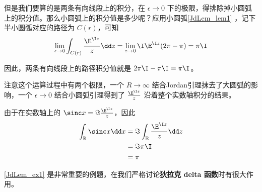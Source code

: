 \begin{example}{}
但是我们要算的是两条有向线段上的积分，在 $\epsilon\to 0$ 下的极限，得排除掉小圆弧上的积分值。那么小圆弧上的积分值是多少呢？应用小圆弧\autoref{JdLem_lem1} ，记下半小圆弧对应的路径为 $C(r)$，可知
\begin{equation}
\lim_{\epsilon\to 0}\int_{C(r)}\frac{\E^{\I z}}{z}\dd z=\lim_{z\to 0}\I\E^{\I z}(2\pi-\pi)=\pi\I
\end{equation}

因此，两条有向线段上的路径积分值就是 $2\pi\I-\pi\I=\pi\I$。

注意这个运算过程中有两个极限，一个 $R\to\infty$ 结合Jordan引理抹去了大圆弧的影响，一个 $\epsilon\to 0$ 结合小圆弧引理得到了 $\frac{\E^{\I z}}{z}$ 沿着整个实数轴积分的结果。

由于在实数轴上的 $\sinc x=\Im \frac{\E^{\I z}}{z}$，因此
\begin{equation}
\begin{aligned}
\int_{\mathbb{R}}\sinc x \dd x&=\Im \int_{\mathbb{R}}\frac{\E^{\I z}}{z}\dd z\\
&=\Im \pi\I\\
&=\pi
\end{aligned}
\end{equation}



\end{example}

\autoref{JdLem_ex1} 是非常重要的例题，在我们严格讨论\textbf{狄拉克 delta 函数}时有很大作用。

